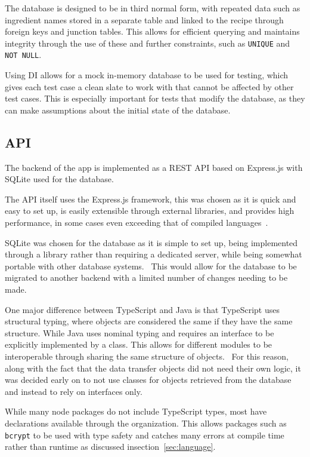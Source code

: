 The database is designed to be in third normal form, with repeated data such as ingredient names stored in a separate
table and linked to the recipe through foreign keys and junction tables. This allows for efficient querying and
maintains integrity through the use of these and further constraints, such as \texttt{UNIQUE} and \texttt{NOT NULL}.~\cite{codd_further_1972}

Using DI allows for a mock in-memory database to be used for testing, which gives each test case a clean slate to work with
that cannot be affected by other test cases. This is especially important for tests that modify the database, as they can
make assumptions about the initial state of the database.

\subsection{API}

The backend of the app is implemented as a REST API based on Express.js with SQLite
used for the database.

The API itself uses the Express.js framework, this was chosen as it is quick and easy to set up, is easily extensible
through external libraries, and provides high performance, in some cases even exceeding that of
compiled languages~\cite{karlsson_performance_2021}.

SQLite was chosen for the database as it is simple to set up, being implemented through
a library rather than requiring a dedicated server, while being somewhat portable with other
database systems.~\cite{kreibich_using_2010} This would allow for the database to be migrated to
another backend with a limited number of changes needing to be made.

One major difference between TypeScript and Java is that TypeScript uses structural typing, where objects are considered
the same if they have the same structure. While Java uses nominal typing and requires an interface to be explicitly
implemented by a class. This allows for different modules to be interoperable through sharing the same structure of objects.~\cite{gil_whiteoak_2008}
For this reason, along with the fact that the data transfer objects did not need their own logic, it was decided early on
to not use classes for objects retrieved from the database and instead to rely on interfaces only.

While many node packages do not include TypeScript types, most have declarations available through the  organization.
This allows packages such as \texttt{bcrypt} to be used with type safety and catches many errors at compile time rather than runtime as discussed
insection~\ref{sec:language}.

